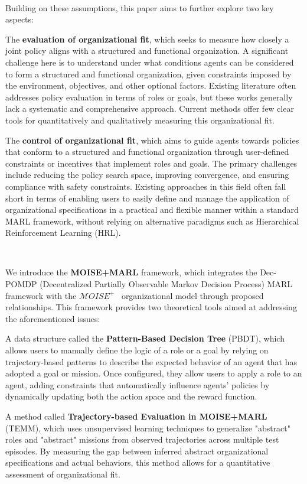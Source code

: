 \documentclass[sigconf,anonymous]{aamas}
\begin{document}
\

Building on these assumptions, this paper aims to further explore two key aspects:
\begin{enumerate*}[label={\roman*)}]
    \item The \textbf{evaluation of organizational fit}, which seeks to measure how closely a joint policy aligns with a structured and functional organization. A significant challenge here is to understand under what conditions agents can be considered to form a structured and functional organization, given constraints imposed by the environment, objectives, and other optional factors.
    Existing literature often addresses policy evaluation in terms of roles or goals, but these works generally lack a systematic and comprehensive approach. Current methods offer few clear tools for quantitatively and qualitatively measuring this organizational fit.
    \item The \textbf{control of organizational fit}, which aims to guide agents towards policies that conform to a structured and functional organization through user-defined constraints or incentives that implement roles and goals.
    The primary challenges include reducing the policy search space, improving convergence, and ensuring compliance with safety constraints.
    Existing approaches in this field often fall short in terms of enabling users to easily define and manage the application of organizational specifications in a practical and flexible manner within a standard MARL framework, without relying on alternative paradigms such as Hierarchical Reinforcement Learning (HRL).
\end{enumerate*}

\

\noindent We introduce the \textbf{MOISE+MARL} framework, which integrates the Dec-POMDP (Decentralized Partially Observable Markov Decision Process) MARL framework with the $\mathcal{M}OISE^+$~\cite{Hubner2007} organizational model through proposed relationships. This framework provides two theoretical tools aimed at addressing the aforementioned issues:

\begin{enumerate*}[label={\roman*)}, itemjoin={; \quad}]
    \item A data structure called the \textbf{Pattern-Based Decision Tree} (PBDT), which allows users to manually define the logic of a role or a goal by relying on trajectory-based patterns to describe the expected behavior of an agent that has adopted a goal or mission. Once configured, they allow users to apply a role to an agent, adding constraints that automatically influence agents' policies by dynamically updating both the action space and the reward function.
    \item A method called \textbf{Trajectory-based Evaluation in MOISE+MARL} (TEMM), which uses unsupervised learning techniques to generalize "abstract" roles and "abstract" missions from observed trajectories across multiple test episodes. By measuring the gap between inferred abstract organizational specifications and actual behaviors, this method allows for a quantitative assessment of organizational fit.
\end{enumerate*}
\end{document}
